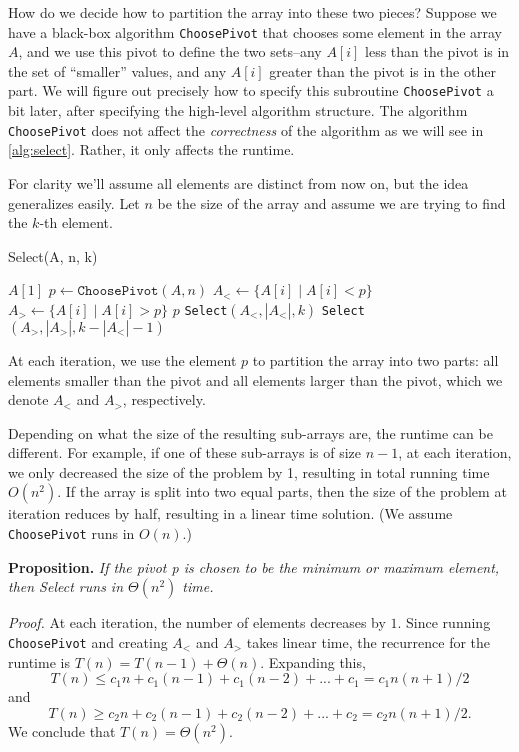 \documentclass [12pt]{article}
\begin{document}
How do we decide how to partition the array into these two pieces? Suppose we have a
black-box algorithm \texttt{ChoosePivot} that chooses some element in the array $A$, and we use this pivot to define the two sets–any $A[i]$ less than the pivot is in the set of ``smaller'' values, and any $A[i]$ greater than the pivot is in the other part. We will figure out precisely how to specify this subroutine \texttt{ChoosePivot} a bit later, after specifying the high-level algorithm structure. The algorithm \texttt{ChoosePivot} does not affect the \textit{correctness} of the algorithm as we will see in \ref{alg:select}. Rather, it only affects the runtime.

For clarity we'll assume all elements are distinct from now on, but the idea generalizes easily. Let $n$ be the size of the array and assume we are trying to find the $k$-th element.

\begin{algorithm}
\caption{Select(A, n, k)}\label{alg:select}
\begin{algorithmic}
    \RETURN $A[1]$
\ENDIF
\STATE $p \gets \texttt{ChoosePivot}(A, n)$
\STATE $A_< \gets \{A[i] \mid A[i] < p \}$
\STATE $A_> \gets \{A[i] \mid A[i] > p \}$
    \RETURN $p$
    \RETURN \texttt{Select}$(A_<, |A_<|, k)$
    \RETURN \texttt{Select}$(A_>, |A_>|, k - |A_<| - 1)$
\ENDIF
\end{algorithmic}
\end{algorithm}

At each iteration, we use the element $p$ to partition the array into two parts: all elements smaller than the pivot and all elements larger than the pivot, which we denote $A_<$ and $A_>$, respectively.

Depending on what the size of the resulting sub-arrays are, the runtime can be different. For example, if one of these sub-arrays is of size $n - 1$, at each iteration, we only decreased the size of the problem by 1, resulting in total running time $O(n^2)$. If the array is split into two equal parts, then the size of the problem at iteration reduces by half, resulting in a linear time solution. (We assume \texttt{ChoosePivot} runs in $O(n)$.)

\textbf{Proposition.} \textit{ If the pivot p is chosen to be the minimum or maximum element, then Select runs in $\Theta(n^2)$ time.}

\textit{Proof.} At each iteration, the number of elements decreases by $1$. Since running \texttt{ChoosePivot} and creating $A_<$ and $A_>$ takes linear time, the recurrence for the runtime is $T(n) = T(n - 1) + \Theta(n)$. Expanding this,
$$
T(n) \leq c_1n + c_1(n -  1) + c_1(n -  2) + ... + c_1 = c_1n(n + 1)/2
$$
and
$$
T(n) \geq c_2n + c_2(n -  1) + c_2(n -  2) + ... + c_2 = c_2n(n + 1)/2.
$$
We conclude that $T(n) = \Theta(n^2)$.
\end{document}
